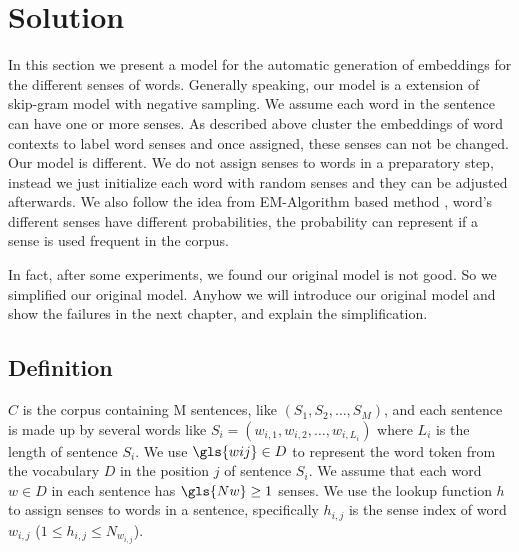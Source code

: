 \chapter{Solution}
\label{cha:solution}

In this section we present a model for the automatic generation of embeddings for the different senses of words. Generally speaking, our model is a extension of skip-gram model with negative sampling. We assume each word in the sentence can have one or more senses. As described above  \cite{HuangSocherEtAl2012} cluster the embeddings of word contexts to label word senses and once assigned, these senses can not be changed. Our model is different. We do not assign senses to words in a preparatory step, instead we just initialize each word with random senses and they can be adjusted afterwards. We also follow the idea from EM-Algorithm based method \citep{TianDaiEtAl2014}, word's different senses have different probabilities, the probability can represent if a sense is used frequent in the corpus. 


In fact, after some experiments, we found our original model is not good. So we simplified our original model. Anyhow we will introduce our original model and show the failures in the next chapter, and explain the simplification. 

\section{Definition}

$C$ is the corpus containing \gls{M} %
sentences, like $(S_1,S_2,\ldots,S_M)$, and each sentence is made up by several words like $S_i = (w_{i,1},w_{i,2},\ldots,w_{i,L_i})$ where $L_i$ is the length of sentence $S_i$. We use $\gls{wij} \in D$ %
to represent the word token from the vocabulary $D$ in the position $j$ of sentence $S_i$. We assume that each word $w\in D$ in each sentence has $\gls{Nw}\ge1$ %
senses.  We use the lookup function $h$ to assign senses to words in a sentence, specifically $h_{i,j}$ is the sense index of word $w_{i,j}$  ($1\leq h_{i,j}\leq N_{w_{i,j}}$). 



